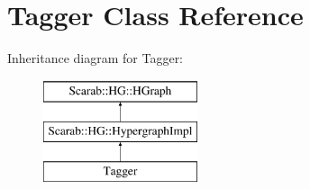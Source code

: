 \hypertarget{class_tagger}{
\section{Tagger Class Reference}
\label{class_tagger}
}
Inheritance diagram for Tagger:\begin{figure}[H]
\begin{center}
\leavevmode
\includegraphics[height=3cm]{class_tagger}
\end{center}
\end{figure}
